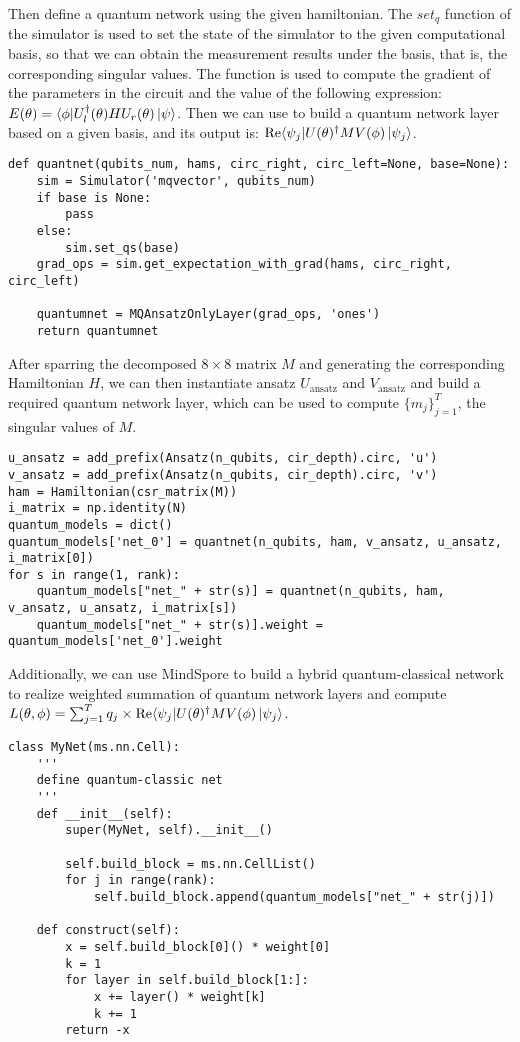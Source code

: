 Then define a quantum network using the given hamiltonian. The $set_q$ function of the simulator is used to set the state of the simulator to the given computational basis, so that we can obtain the measurement results under the basis, that is, the corresponding singular values. The \getexpectationwithgrad function is used to compute the gradient of the parameters in the circuit and the value of the following expression: $E(\theta) = \langle\phi| U_l^{\dagger}(\theta) H U_r(\theta)\ket{\psi}$. Then we can use \MQAnsatzOnlyLayer to build a quantum network layer based on a given basis, and its output is: $\text{Re}\langle\psi_j|U(\theta)^{\dagger} M V(\phi)\ket{\psi_j}$.
\begin{lstlisting}
def quantnet(qubits_num, hams, circ_right, circ_left=None, base=None):
    sim = Simulator('mqvector', qubits_num)
    if base is None:
        pass
    else:
        sim.set_qs(base)
    grad_ops = sim.get_expectation_with_grad(hams, circ_right, circ_left)

    quantumnet = MQAnsatzOnlyLayer(grad_ops, 'ones')
    return quantumnet
\end{lstlisting}
After sparring the decomposed $8 \times 8$ matrix $M$ and generating the corresponding Hamiltonian $H$, we can then instantiate ansatz $U_\text{ansatz}$ and $V_\text{ansatz}$ and build a required quantum network layer, which can be used to compute $\{m_j\}_{j=1}^T$, the singular values of $M$.
\begin{lstlisting}
u_ansatz = add_prefix(Ansatz(n_qubits, cir_depth).circ, 'u')
v_ansatz = add_prefix(Ansatz(n_qubits, cir_depth).circ, 'v')
ham = Hamiltonian(csr_matrix(M))
i_matrix = np.identity(N)
quantum_models = dict()
quantum_models['net_0'] = quantnet(n_qubits, ham, v_ansatz, u_ansatz, i_matrix[0])
for s in range(1, rank):
    quantum_models["net_" + str(s)] = quantnet(n_qubits, ham, v_ansatz, u_ansatz, i_matrix[s])
    quantum_models["net_" + str(s)].weight = quantum_models['net_0'].weight
\end{lstlisting}
Additionally, we can use MindSpore to build a hybrid quantum-classical network to realize weighted summation of quantum network layers and compute $L(\theta,\phi) = \sum_{j=1}^T q_j \times \text{Re} \langle\psi_j| U(\theta)^{\dagger} M V(\phi)\ket{\psi_j}$.
\begin{lstlisting}
class MyNet(ms.nn.Cell):
    '''
    define quantum-classic net
    '''
    def __init__(self):
        super(MyNet, self).__init__()

        self.build_block = ms.nn.CellList()
        for j in range(rank):
            self.build_block.append(quantum_models["net_" + str(j)])

    def construct(self):
        x = self.build_block[0]() * weight[0]
        k = 1
        for layer in self.build_block[1:]:
            x += layer() * weight[k]
            k += 1
        return -x
\end{lstlisting}
